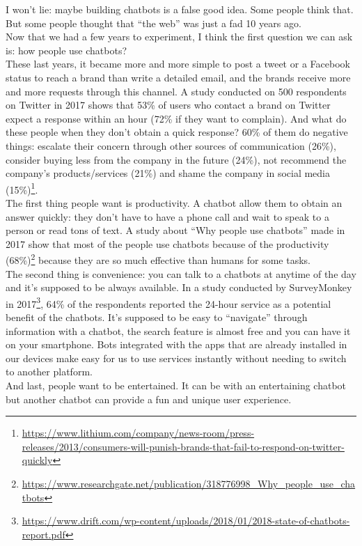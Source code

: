\documentclass{article}
\begin{document}
I won’t lie: maybe building chatbots is a false good idea. Some people think that. But some people thought that “the web” was just a fad 10 years ago.\\
\break
Now that we had a few years to experiment, I think the first question we can ask is: how people use chatbots?\\
\break
These last years, it became more and more simple to post a tweet or a Facebook status to reach a brand than write a detailed email, and the brands receive more and more requests through this channel. A study conducted on 500 respondents on Twitter in 2017 shows that 53\% of users who contact a brand on Twitter expect a response within an hour (72\% if they want to complain). And what do these people when they don’t obtain a quick response? 60\% of them do negative things: escalate their concern through other sources of communication (26\%), consider buying less from the company in the future (24\%), not recommend the company’s products/services (21\%) and shame the company in social media (15\%)\footnote{\url{https://www.lithium.com/company/news-room/press-releases/2013/consumers-will-punish-brands-that-fail-to-respond-on-twitter-quickly}}.\\
The first thing people want is productivity. A chatbot allow them to obtain an answer quickly: they don’t have to have a phone call and wait to  speak to a person or read tons of text. A study about “Why people use chatbots” made in 2017 show that most of the people use chatbots because of the productivity (68\%)\footnote{\url{https://www.researchgate.net/publication/318776998_Why_people_use_chatbots}} because they are so much effective than humans for some tasks.\\
\break
The second thing is convenience: you can talk to a chatbots at anytime of the day and it’s supposed to be always available. In a study conducted by SurveyMonkey in 2017\footnote{\url{https://www.drift.com/wp-content/uploads/2018/01/2018-state-of-chatbots-report.pdf}}, 64\% of the respondents reported the 24-hour service as a potential benefit of the chatbots. It’s  supposed to be easy to “navigate” through information with a chatbot, the search feature is almost free and you can have it on your smartphone. Bots integrated with the apps that are already installed in our devices make easy for us to use services instantly without needing to switch to another platform.\\
\break
And last, people want to be entertained. It can be with an entertaining chatbot but another chatbot can provide a fun and unique user experience.
\end{document}
